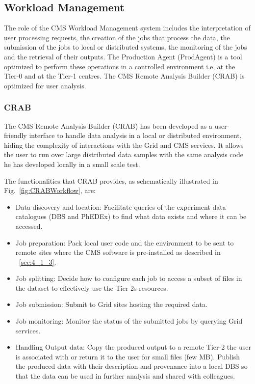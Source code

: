 \subsection{Workload Management}
The role of the CMS Workload Management system includes the interpretation of user processing requests, the creation of the jobs that process the data, the submission of the jobs to local or distributed systems, the monitoring of the jobs and the retrieval of their outputs. The Production Agent (ProdAgent)\cite{RefPA} is a tool optimized to perform these operations in a controlled environment i.e. at the Tier-0 and at the Tier-1 centres. The CMS Remote Analysis Builder (CRAB) is optimized for user analysis.

%
\label{sec:3_2}
\subsubsection{CRAB}
\label{sec:CRAB}
The CMS Remote Analysis Builder (CRAB)\cite{RefCRAB} has been developed as a user-friendly interface to handle data analysis in a local or distributed environment, hiding the complexity of interactions with the Grid and CMS services.
It allows the user to run over large distributed data samples with the same analysis code he has developed 
locally in a small scale test. 

The functionalities that CRAB provides, as schematically illustrated in Fig.~\ref{fig:CRABWorkflow}, are:
\begin{itemize}
\item{Data discovery and location:}
Facilitate queries of the experiment data catalogues (DBS and PhEDEx) to find 
what data exists and where it can be accessed.
\item{Job preparation:}
Pack local user code and the environment to be sent to remote sites where the CMS software is pre-installed as described in ~\ref{sec:4_1_3}.
\item{Job splitting:}
Decide how to configure each job to access a subset of files in the dataset to effectively use the Tier-2s resources.
\item{Job submission:}
Submit to Grid sites hosting the required data.
\item{Job monitoring:}
Monitor the status of the submitted jobs by querying Grid services.
\item{Handling Output data:}
Copy the produced output to a remote Tier-2 the user is associated with or return it to the user for small files (few MB).
Publish the produced data with their description and provenance into a local DBS so that the data can be used in further analysis and shared with colleagues.
\end{itemize} 


